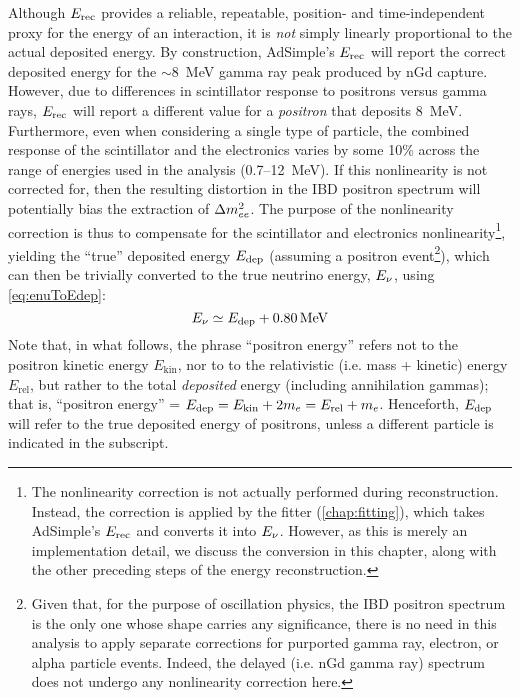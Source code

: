 \documentclass[../thesis.tex]{subfiles}
\begin{document}
  Although $E_\mathrm{rec}$ provides a reliable, repeatable, position- and time-independent proxy for the energy of an interaction, it is \emph{not} simply linearly proportional to the actual deposited energy. By construction, AdSimple's $E_\mathrm{rec}$ will report the correct deposited energy for the $\sim$8~MeV gamma ray peak produced by nGd capture. However, due to differences in scintillator response to positrons versus gamma rays, $E_\mathrm{rec}$ will report a different value for a \emph{positron} that deposits 8~MeV. Furthermore, even when considering a single type of particle, the combined response of the scintillator and the electronics varies by some 10\% across the range of energies used in the analysis (0.7--12~MeV). If this nonlinearity is not corrected for, then the resulting distortion in the IBD positron spectrum will potentially bias the extraction of $\Delta m^2_{ee}$. The purpose of the nonlinearity correction is thus to compensate for the scintillator and electronics nonlinearity\footnote{The nonlinearity correction is not actually performed during reconstruction. Instead, the correction is applied by the fitter (\autoref{chap:fitting}), which takes AdSimple's $E_\mathrm{rec}$ and converts it into $E_\mathrm{\nu}$. However, as this is merely an implementation detail, we discuss the conversion in this chapter, along with the other preceding steps of the energy reconstruction.}, yielding the ``true'' deposited energy $E_\mathrm{dep}$ (assuming a positron event\footnote{Given that, for the purpose of oscillation physics, the IBD positron spectrum is the only one whose shape carries any significance, there is no need in this analysis to apply separate corrections for purported gamma ray, electron, or alpha particle events. Indeed, the delayed (i.e. nGd gamma ray) spectrum does not undergo any nonlinearity correction here.}), which can then be trivially converted to the true neutrino energy, $E_\mathrm{\nu}$, using \autoref{eq:enuToEdep}:
\begin{equation}
  E_\mathrm{\nu} \simeq E_\mathrm{dep} + \SI{0.80}{MeV} 
\end{equation}
Note that, in what follows, the phrase ``positron energy'' refers not to the positron kinetic energy $E_{\mathrm{kin}}$, nor to to the relativistic (i.e. mass + kinetic) energy $E_{\mathrm{rel}}$, but rather to the total \emph{deposited} energy (including annihilation gammas); that is, ``positron energy'' = $E_\mathrm{dep} = E_{\mathrm{kin}} + 2m_e = E_{\mathrm{rel}} + m_e$. Henceforth, $E_\mathrm{dep}$ will refer to the true deposited energy of positrons, unless a different particle is indicated in the subscript.
\end{document}
